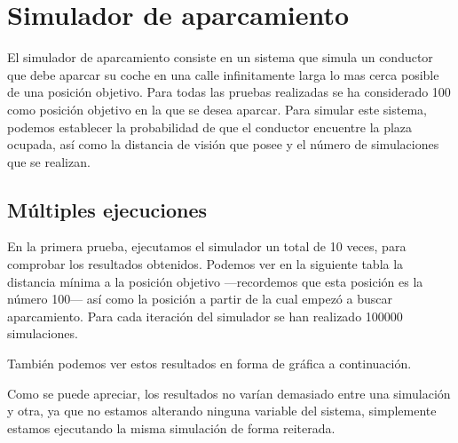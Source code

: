 \chapter{Simulador de aparcamiento}
El simulador de aparcamiento consiste en un sistema que simula un conductor que debe aparcar su coche en una calle infinitamente larga lo mas cerca posible de una posición objetivo. Para todas las pruebas realizadas se ha considerado 100 como posición objetivo en la que se desea aparcar. Para simular este sistema, podemos establecer la probabilidad de que el conductor encuentre la plaza ocupada, así como la distancia de visión que posee y el número de simulaciones que se realizan.
\section{Múltiples ejecuciones}
En la primera prueba, ejecutamos el simulador un total de 10 veces, para comprobar los resultados obtenidos. Podemos ver en la siguiente tabla la distancia mínima a la posición objetivo ---recordemos que esta posición es la número 100--- así como la posición a partir de la cual empezó a buscar aparcamiento. Para cada iteración del simulador se han realizado 100000 simulaciones.
\begin{table}[h]
\centering
{}
\end{table}

También podemos ver estos resultados en forma de gráfica a continuación.

Como se puede apreciar, los resultados no varían demasiado entre una simulación y otra, ya que no estamos alterando ninguna variable del sistema, simplemente estamos ejecutando la misma simulación de forma reiterada.

